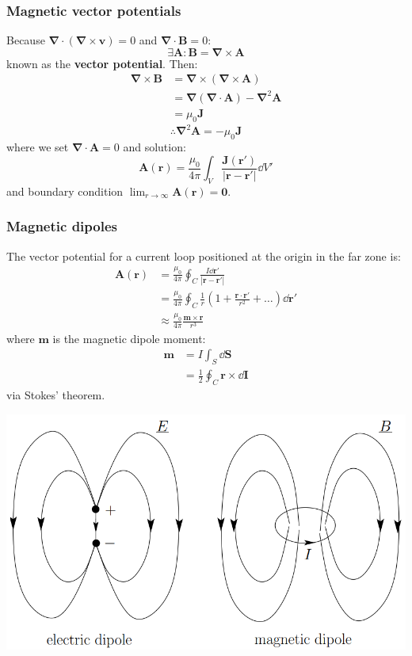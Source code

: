 \documentclass{article}
\newcommand{\vc}[1]{\boldsymbol{#1}}
\begin{document}
\begin{multicols*}{3}
\subsubsection*{Magnetic vector potentials}
Because $\vc{\nabla}\cdot(\vc{\nabla}\times\vc{v})=0$
and $\vc{\nabla}\cdot\vc{B}=0$:
$$\exists\vc{A}:\vc{B}=\vc{\nabla}\times\vc{A}$$
known as the \textbf{vector potential}. Then:
\begin{align*}
    \vc{\nabla}\times\vc{B}
    &=\vc{\nabla}\times
    (\vc{\nabla}\times\vc{A}) \\
    &=\vc{\nabla}(\vc{\nabla}\cdot\vc{A})
    -\vc{\nabla}^2\vc{A} \\
    &=\mu_0\vc{J}
\end{align*}
$$\therefore\vc{\nabla}^2\vc{A}=-\mu_0\vc{J}$$
where we set $\vc{\nabla}\cdot\vc{A}=0$ and solution:
$$\vc{A}(\vc{r})=\frac{\mu_0}{4\pi}\int_V
\frac{\vc{J}(\vc{r}')}{|\vc{r}-\vc{r}'|}\dd V'$$
and boundary condition $\displaystyle\lim_{r\rightarrow\infty}
\vc{A}(\vc{r})=\vc{0}$.

\subsubsection*{Magnetic dipoles}
The vector potential for a current loop positioned
at the origin in the far zone is:
\begin{align*}
    \vc{A}(\vc{r})
    &=\frac{\mu_0}{4\pi}\oint_C
    \frac{I\dd\vc{r}'}{|\vc{r}-\vc{r}'|} \\
    &=\frac{\mu_0}{4\pi}\oint_C\frac{1}{r}\left(1+
    \frac{\vc{r}\cdot\vc{r}'}{r^2}+\dots\right)\dd\vc{r}' \\
    &\approx\frac{\mu_0}{4\pi}\frac{\vc{m}\times\vc{r}}{r^3}
\end{align*}
where $\vc{m}$ is the magnetic dipole moment:
\begin{align*}
    \vc{m}
    &=I\int_S\dd\vc{S} \\
    &=\frac{1}{2}\oint_C\vc{r}\times\dd\vc{I}
\end{align*}
via Stokes' theorem.
\begin{center}
    \includegraphics[scale=0.4]{f09.png}
\end{center}


\end{multicols*}
\end{document}
